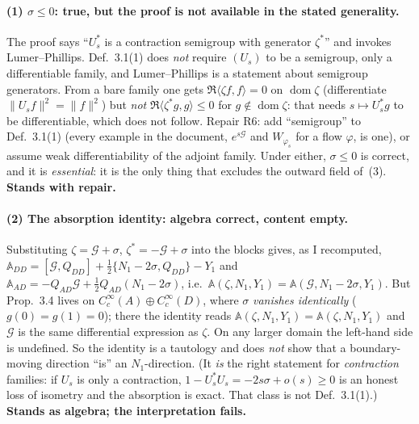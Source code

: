 \documentclass[11pt]{article}
\newcommand{\Aop}{\mathbb A}
\begin{document}
\paragraph{(1) $\sigma\le0$: true, but the proof is not available in the stated generality.}
The proof says ``$U_s^*$ is a contraction semigroup with generator $\zeta^*$'' and invokes
Lumer--Phillips.  Def.~3.1(1) does \emph{not} require $(U_s)$ to be a semigroup, only a
differentiable family, and Lumer--Phillips is a statement about semigroup generators.  From
a bare family one gets $\Re\langle\zeta f,f\rangle=0$ on $\operatorname{dom}\zeta$
(differentiate $\|U_sf\|^2=\|f\|^2$) but \emph{not} $\Re\langle\zeta^*g,g\rangle\le0$ for
$g\notin\operatorname{dom}\zeta$: that needs $s\mapsto U_s^*g$ to be differentiable, which
does not follow.  Repair R6: add ``semigroup'' to Def.~3.1(1) (every example in the
document, $e^{s\mathcal G}$ and $W_{\varphi_s}$ for a flow $\varphi$, is one), or assume
weak differentiability of the adjoint family.  Under either, $\sigma\le0$ is correct, and
it is \emph{essential}: it is the only thing that excludes the outward field of~(3).
\textbf{Stands with repair.}

\paragraph{(2) The absorption identity: algebra correct, content empty.}
Substituting $\zeta=\mathcal G+\sigma$, $\zeta^*=-\mathcal G+\sigma$ into the blocks gives,
as I recomputed,
$\Aop_{DD}=[\mathcal G,Q_{DD}]+\frac12\{N_1-2\sigma,Q_{DD}\}-Y_1$ and
$\Aop_{AD}=-Q_{AD}\mathcal G+\frac12Q_{AD}(N_1-2\sigma)$, i.e.\
$\Aop(\zeta,N_1,Y_1)=\Aop(\mathcal G,N_1-2\sigma,Y_1)$.  But Prop.~3.4 lives on
$C_c^\infty(A)\oplus C_c^\infty(D)$, where $\sigma$ \emph{vanishes identically}
($g(0)=g(1)=0$); there the identity reads $\Aop(\zeta,N_1,Y_1)=\Aop(\zeta,N_1,Y_1)$ and
$\mathcal G$ is the same differential expression as $\zeta$.  On any larger domain the
left-hand side is undefined.  So the identity is a tautology and does \emph{not} show that
a boundary-moving direction ``is'' an $N_1$-direction.  (It \emph{is} the right statement
for \emph{contraction} families: if $U_s$ is only a contraction, $1-U_s^*U_s=-2s\sigma+o(s)
\ge0$ is an honest loss of isometry and the absorption is exact.  That class is not
Def.~3.1(1).)  \textbf{Stands as algebra; the interpretation fails.}
\end{document}
